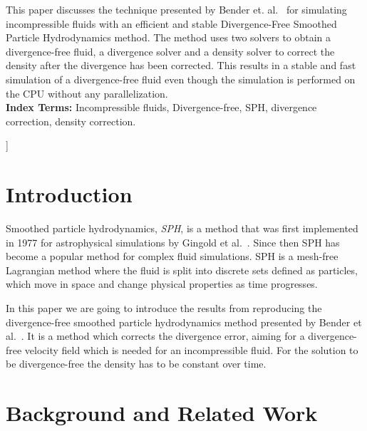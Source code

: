 \begin{onecolabstract}
    \noindent This paper discusses the technique presented by Bender et. al.~\cite{bender} for simulating incompressible fluids with an efficient and stable Divergence-Free Smoothed Particle Hydrodynamics method.
    The method uses two solvers to obtain a divergence-free fluid, a divergence solver and a density solver to correct the density after the divergence has been corrected.
    This results in a stable and fast simulation of a divergence-free fluid even though the simulation is performed on the CPU without any parallelization.
    \vspace{1em}\\{\bf Index Terms:} Incompressible fluids, Divergence-free, SPH, divergence correction, density correction.\vspace{1em}
\end{onecolabstract}
]
\saythanks

\section{Introduction}
    Smoothed particle hydrodynamics, \textit{SPH}, is a method that was first implemented in 1977 for astrophysical simulations by Gingold et al.~\cite{firstSPH}.
    Since then SPH has become a popular method for complex fluid simulations.
    SPH is a mesh-free Lagrangian method where the fluid is split into discrete sets defined as particles, which move in space and change physical properties as time progresses.
    
    In this paper we are going to introduce the results from reproducing the divergence-free smoothed particle hydrodynamics method presented by Bender et al.~\cite{bender}.
    It is a method which corrects the divergence error, aiming for a divergence-free velocity field which is needed for an incompressible fluid.
    For the solution to be divergence-free the density has to be constant over time.
    

\section{Background and Related Work}

